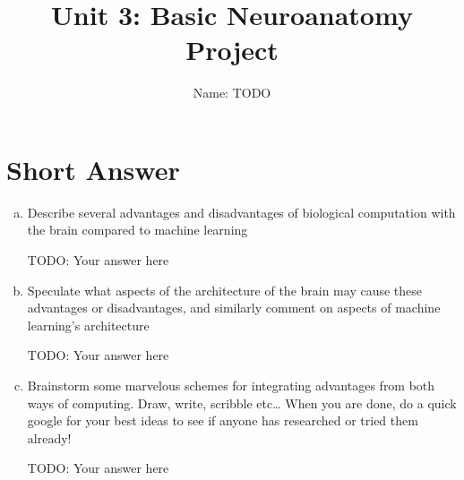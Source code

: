 \documentclass[letterpaper,11pt]{article}
\begin{document}
\title{{\bf Unit 3: Basic Neuroanatomy Project} }
\author{Name: TODO}

\date{}
\maketitle

\section*{Short Answer}
\begin{enumerate}[a)]
\item Describe several advantages and disadvantages of biological computation with the brain compared to machine learning

\begin{tcolorbox}
TODO: Your answer here
\end{tcolorbox}

\item Speculate what aspects of the architecture of the brain may cause these advantages or disadvantages, and similarly comment on aspects of machine learning’s architecture

\begin{tcolorbox}
TODO: Your answer here
\end{tcolorbox}

\item Brainstorm some marvelous schemes for integrating advantages from both ways of computing. Draw, write, scribble etc… When you are done, do a quick google for your best ideas to see if anyone has researched or tried them already!

\begin{tcolorbox}
TODO: Your answer here
\end{tcolorbox}
    
\end{enumerate}
\end{document}
